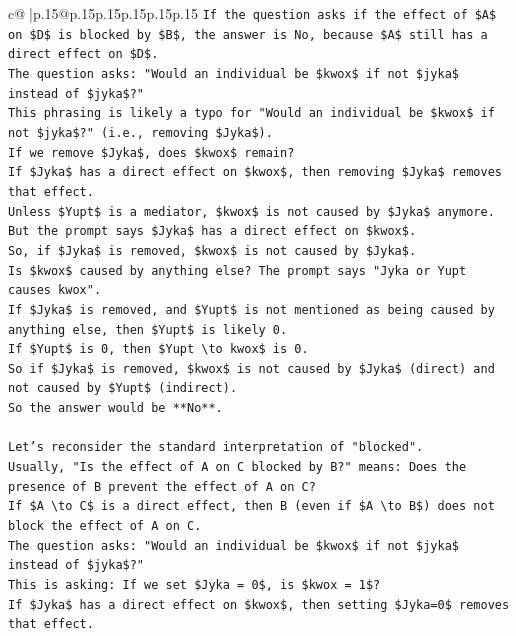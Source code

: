 \documentclass{article}
\begin{document}
{\begin{supertabular}{c@{$\;$}|p{.15\linewidth}@{}p{.15\linewidth}p{.15\linewidth}p{.15\linewidth}p{.15\linewidth}p{.15\linewidth}}
{{{\texttt{If the question asks if the effect of \$A\$ on \$D\$ is blocked by \$B\$, the answer is No, because \$A\$ still has a direct effect on \$D\$.} \\
\texttt{The question asks: "Would an individual be \$kwox\$ if not \$jyka\$ instead of \$jyka\$?"} \\
\texttt{This phrasing is likely a typo for "Would an individual be \$kwox\$ if not \$jyka\$?" (i.e., removing \$Jyka\$).} \\
\texttt{If we remove \$Jyka\$, does \$kwox\$ remain?} \\
\texttt{If \$Jyka\$ has a direct effect on \$kwox\$, then removing \$Jyka\$ removes that effect.} \\
\texttt{Unless \$Yupt\$ is a mediator, \$kwox\$ is not caused by \$Jyka\$ anymore.} \\
\texttt{But the prompt says \$Jyka\$ has a direct effect on \$kwox\$.} \\
\texttt{So, if \$Jyka\$ is removed, \$kwox\$ is not caused by \$Jyka\$.} \\
\texttt{Is \$kwox\$ caused by anything else? The prompt says "Jyka or Yupt causes kwox".} \\
\texttt{If \$Jyka\$ is removed, and \$Yupt\$ is not mentioned as being caused by anything else, then \$Yupt\$ is likely 0.} \\
\texttt{If \$Yupt\$ is 0, then \$Yupt \textbackslash{}to kwox\$ is 0.} \\
\texttt{So if \$Jyka\$ is removed, \$kwox\$ is not caused by \$Jyka\$ (direct) and not caused by \$Yupt\$ (indirect).} \\
\texttt{So the answer would be **No**.} \\
\\ 
\texttt{Let's reconsider the standard interpretation of "blocked".} \\
\texttt{Usually, "Is the effect of A on C blocked by B?" means: Does the presence of B prevent the effect of A on C?} \\
\texttt{If \$A \textbackslash{}to C\$ is a direct effect, then B (even if \$A \textbackslash{}to B\$) does not block the effect of A on C.} \\
\texttt{The question asks: "Would an individual be \$kwox\$ if not \$jyka\$ instead of \$jyka\$?"} \\
\texttt{This is asking: If we set \$Jyka = 0\$, is \$kwox = 1\$?} \\
\texttt{If \$Jyka\$ has a direct effect on \$kwox\$, then setting \$Jyka=0\$ removes that effect.} \\
}}}
\end{supertabular}}
\end{document}
